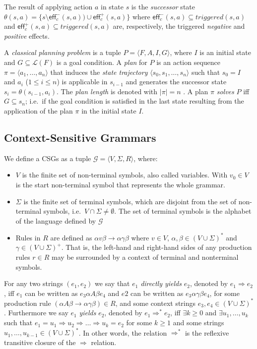 \documentclass[letterpaper]{article} %
\newcommand{\tup}[1]{{\langle #1 \rangle}}
\newcommand{\eff}{\mathsf{eff}}     %
\begin{document}
The result of applying action $a$ in state $s$ is the {\em successor} state $\theta(s,a)=\{s\setminus\eff_c^-(s,a))\cup\eff_c^+(s,a)\}$ where $\eff_c^-(s,a)\subseteq triggered(s,a)$ and $\eff_c^+(s,a)\subseteq triggered(s,a)$ are, respectively, the triggered {\em negative} and {\em positive} effects.

A {\em classical planning problem} is a tuple $P=\tup{F,A,I,G}$, where $I$ is an initial state and $G\subseteq\mathcal{L}(F)$ is a goal condition. A {\em plan} for $P$ is an action sequence $\pi=\tup{a_1, \ldots, a_n}$ that induces the {\em state trajectory} $\tup{s_0, s_1, \ldots, s_n}$ such that $s_0=I$ and $a_i$ ({\small $1\leq i\leq n$}) is applicable in $s_{i-1}$ and generates the successor state $s_i=\theta(s_{i-1},a_i)$. The {\em plan length} is denoted with $|\pi|=n$ . A plan $\pi$ {\em solves} $P$ iff $G\subseteq s_n$; i.e.~if the goal condition is satisfied in the last state resulting from the application of the plan $\pi$ in the initial state $I$.

\subsection{Context-Sensitive Grammars}
We define a CSGs as a tuple $\mathcal{G}=\tup{V,\Sigma,R}$, where:
\begin{itemize}
\item $V$ is the finite set of non-terminal symbols, also called variables. With $v_0\in V$ is the start non-terminal symbol that represents the whole grammar.
\item $\Sigma$ is the finite set of terminal symbols, which are disjoint from the set of non-terminal symbols, i.e.~$V\cap \Sigma\neq\emptyset$. The set of terminal symbols is the alphabet of the language defined by $\mathcal{G}$
\item Rules in $R$ are defined as $\alpha v\beta\rightarrow \alpha\gamma\beta$ where $v\in V$, $\alpha,\beta\in(V\cup\Sigma)^*$ and $\gamma\in(V\cup\Sigma)^+$. That is, the left-hand and right-hand sides of any production rules $r\in R$ may be surrounded by a context of terminal and nonterminal symbols.
\end{itemize}

For any two strings $(e_1,e_2)$ we say that $e_1$ {\it directly yields} $e_2$, denoted by $e_1\Rightarrow e_2$, iff $e_1$ can be written as $e_3\alpha A\beta e_4$ and $e2$ can be written as $e_3\alpha \gamma\beta e_4$, for some production rule $(\alpha A\beta\rightarrow\alpha\gamma\beta)\in R$, and some context strings $e_3,e_4\in (V\cup \Sigma)^*$. Furthermore we say $e_1$ {\it yields} $e_2$, denoted by $e_1\Rightarrow^* e_2$, iff $\exists k\geq 0$ and $\exists u_1, \ldots, u_k$ such that $e_1=u_1\Rightarrow u_2\Rightarrow \ldots \Rightarrow u_k=e_2$ for some $k\geq 1$ and some strings $u_1,\ldots,u_{k-1}\in(V\cup\Sigma)^*$. In other words, the relation $\Rightarrow^*$ is the reflexive transitive closure of the $\Rightarrow$ relation.
\end{document}
